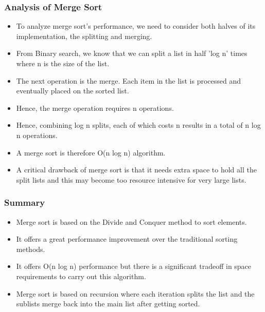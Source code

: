 \documentclass{beamer}
\begin{document}
\begin{frame}
\frametitle{Analysis of Merge Sort}
\begin{itemize}
\item To analyze merge sort's performance, we need to consider both halves of its implementation, the splitting and merging.
\item From Binary search, we know that we can split a list in half 'log n' times where n is the size of the  list.
\item The next operation is the merge. Each item in the list is processed and eventually placed on the sorted list. 
\item Hence, the merge operation requires n operations.
\item Hence, combining log n splits, each of which costs n results in a total of n log n operations.
\item A merge sort is therefore O(n log n) algorithm. 
\item A critical drawback of merge sort is that it needs extra space to hold all the split lists and this may become too resource intensive for very large lists.
\end{itemize}
\end{frame}

\begin{frame}
\frametitle{Summary}
\begin{itemize}
\item Merge sort is based on the Divide and Conquer method to sort elements.
\item It offers a great performance improvement over the traditional sorting methods.
\item It offers O(n log n) performance but there is a significant tradeoff in space requirements to carry out this algorithm.
\item Merge sort is based on recursion where each iteration splits the list and the sublists merge back into the main list after getting sorted.
\end{itemize}
\end{frame}
\end{document}
